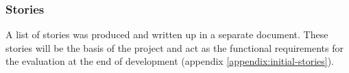 \subsubsection{Stories}
A list of stories was produced and written up in a separate document. These stories will be the basis of the project and act as the functional requirements for the evaluation at the end of development (appendix \ref{appendix:initial-stories}).
\newpage